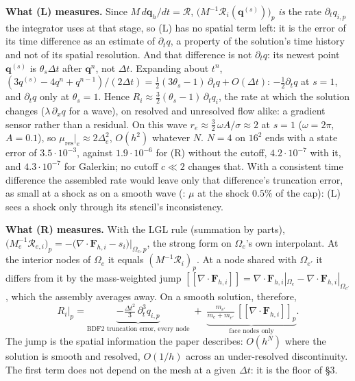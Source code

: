 \documentclass[10pt]{article}
\newcommand{\qq}{\bm{q}}
\newcommand{\FF}{\bm{F}}
\newcommand{\Rc}{\mathcal{R}}
\newcommand{\jump}[1]{[\![#1]\!]}
\newcommand{\mres}{\mu_{\mathrm{res}}\big|_e}
\begin{document}
\textbf{What (L) measures.} Since $M\,d\qq_h/dt=\Rc$, $\big(M^{-1}\Rc_i(\qq^{(s)})\big)_p$ \emph{is} the rate $\partial_tq_{i,p}$ the
integrator uses at that stage, so (L) has no spatial term left: it is the error of its time difference as an estimate of
$\partial_tq$, a property of the solution's time history and not of its spatial resolution. And that difference is not
$\partial_tq$: its newest point $\qq^{(s)}$ is $\theta_s\Delta t$ after $\qq^n$, not $\Delta t$. Expanding about $t^n$,
$(3q^{(s)}-4q^n+q^{n-1})/(2\Delta t)=\tfrac12(3\theta_s-1)\,\partial_tq+O(\Delta t)$: $-\tfrac12\partial_tq$ at $s=1$, and $\partial_tq$
only at $\theta_s=1$. Hence $R_i\approx\tfrac32(\theta_s-1)\,\partial_tq_i$, the rate at which the solution changes
($\lambda\,\partial_xq$ for a wave), on resolved and unresolved flow alike: a gradient sensor rather than a residual. On this wave
$r_e\approx\tfrac32\,\omega A/\sigma\approx2$ at $s=1$ ($\omega=2\pi$, $A=0.1$), so $\mres\approx2\Delta_e^2$, $O(h^2)$ whatever $N$.
$N=4$ on $16^2$ ends with a state error of $3.5\cdot10^{-3}$, against $1.9\cdot10^{-6}$ for (R) without the cutoff,
$4.2\cdot10^{-7}$ with it, and $4.3\cdot10^{-7}$ for Galerkin; no cutoff $c\ll2$ changes that. With a consistent time difference the
assembled rate would leave only that difference's truncation error, as small at a shock as on a smooth wave (: $\mu$ at
the shock $0.5\%$ of the cap): (L) sees a shock only through its stencil's inconsistency.

\textbf{What (R) measures.} With the LGL rule (summation by parts),
$\big(M_e^{-1}\Rc_{e,i}\big)_p=-\big(\nabla\cdot\FF_{h,i}-s_i\big)\big|_{\Omega_e,p}$, the strong form on $\Omega_e$'s own
interpolant. At the interior nodes of $\Omega_e$ it equals $(M^{-1}\Rc_i)_p$. At a node shared with $\Omega_{e'}$ it differs from it
by the mass-weighted jump $\jump{\nabla\cdot\FF_{h,i}}=\nabla\cdot\FF_{h,i}|_{\Omega_e}-\nabla\cdot\FF_{h,i}|_{\Omega_{e'}}$,
which the assembly averages away. On a smooth solution, therefore,
\[
R_i\big|_p=\underbrace{-\tfrac{\Delta t^2}{3}\,\partial_t^3q_{i,p}}_{\text{BDF2 truncation error, every node}}
\;+\;\underbrace{\tfrac{m_{e'}}{m_e+m_{e'}}\,\jump{\nabla\cdot\FF_{h,i}}_p}_{\text{face nodes only}} .
\]
The jump is the spatial information the paper describes: $O(h^N)$ where the solution is smooth and resolved, $O(1/h)$ across an
under-resolved discontinuity. The first term does not depend on the mesh at a given $\Delta t$: it is the floor of \S3.
\end{document}

